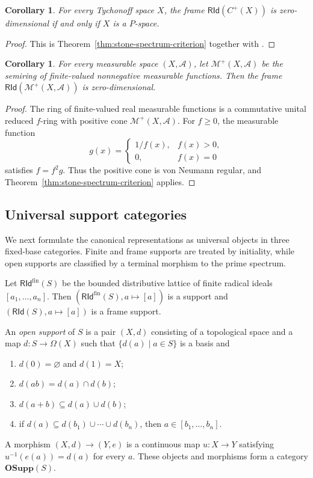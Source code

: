 \documentclass[12pt,leqno]{amsart}
\newcommand{\OSupp}{\mathbf{OSupp}}
\newcommand{\RId}{\mathsf{RId}}
\newtheorem{corollary}[theorem]{Corollary}
\theoremstyle{definition}
\numberwithin{equation}{section}
\theoremstyle{remark}
\begin{document}
\begin{corollary}
For every Tychonoff space $X$, the frame \(\RId(C^+(X))\) is zero-dimensional if and only if $X$ is a $P$-space.
\end{corollary}

\begin{proof}
This is Theorem~\ref{thm:stone-spectrum-criterion} together with \cite[Corollary~4.17]{BiswasFilomat}.
\end{proof}

\begin{corollary}
For every measurable space \((X,\mathcal A)\), let \(\mathcal M^+(X,\mathcal A)\) be the semiring of finite-valued nonnegative measurable functions. Then the frame
\(\RId(\mathcal M^+(X,\mathcal A))\) is zero-dimensional.
\end{corollary}

\begin{proof}
The ring of finite-valued real measurable functions is a commutative unital reduced $f$-ring with positive cone \(\mathcal M^+(X,\mathcal A)\). For \(f\geq0\), the measurable function
\[
g(x)=
\begin{cases}
1/f(x),&f(x)>0,\\
0,&f(x)=0
\end{cases}
\]
satisfies \(f=f^2g\). Thus the positive cone is von Neumann regular, and Theorem~\ref{thm:stone-spectrum-criterion} applies.
\end{proof}

\subsection{Universal support categories}

We next formulate the canonical representations as universal objects in three fixed-base categories. Finite and frame supports are treated by initiality, while open supports are classified by a terminal morphism to the prime spectrum.

Let \(\RId^{\mathrm{fin}}(S)\) be the bounded distributive lattice of finite radical ideals \([a_1,\ldots,a_n]\). Then
\((\RId^{\mathrm{fin}}(S),a\mapsto[a])\) is a support and
\((\RId(S),a\mapsto[a])\) is a frame support.

An \emph{open support} of $S$ is a pair \((X,d)\) consisting of a topological space and a map \(d\colon S\to\Omega(X)\) such that \(\{d(a)\mid a\in S\}\) is a basis and
\begin{enumerate}
\item \(d(0)=\varnothing\) and \(d(1)=X\);
\item \(d(ab)=d(a)\cap d(b)\);
\item \(d(a+b)\subseteq d(a)\cup d(b)\);
\item if \(d(a)\subseteq d(b_1)\cup\cdots\cup d(b_n)\), then
\(a\in[b_1,\ldots,b_n]\).
\end{enumerate}
A morphism \((X,d)\to(Y,e)\) is a continuous map \(u\colon X\to Y\) satisfying
\(u^{-1}(e(a))=d(a)\) for every $a$. These objects and morphisms form a category \(\OSupp(S)\).
\end{document}

